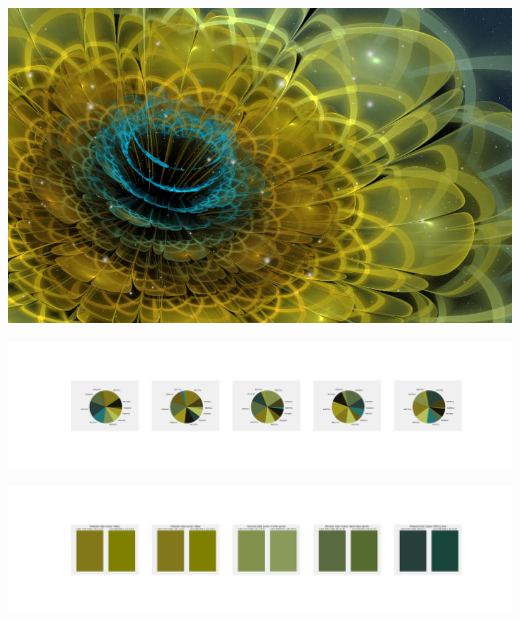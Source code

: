 \documentclass[11pt]{article}
\begin{document}
\begin{landscape}
    \begin{center}
    \includegraphics[width=\textwidth]{./nbimg/file (34).jpg}
    \end{center}

    \begin{center}
    \includegraphics[width=250mm]{./nbimg/pie-267.jpg}
    \end{center}

    \begin{center}
    \includegraphics[width=250mm]{./nbimg/peak-267.jpg}
    \end{center}
    


\end{landscape}
\end{document}
